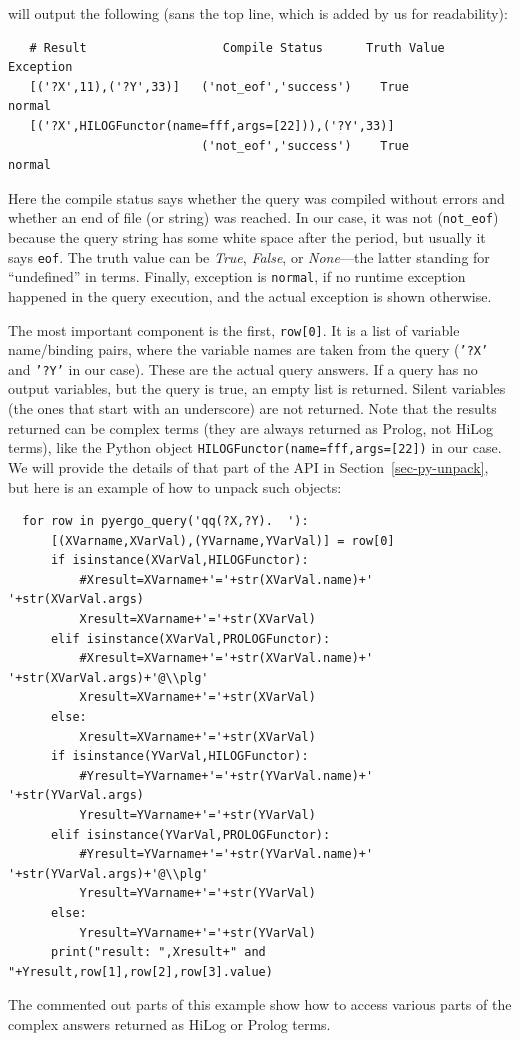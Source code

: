 will output the following (sans the top line, which is added by us for readability):
\begin{verbatim}
   # Result                   Compile Status      Truth Value    Exception
   [('?X',11),('?Y',33)]   ('not_eof','success')    True           normal
   [('?X',HILOGFunctor(name=fff,args=[22])),('?Y',33)]
                           ('not_eof','success')    True           normal
\end{verbatim}
Here the compile status says whether the query was compiled without errors
and whether an end of file (or string)
was reached. In our case, it was not (\texttt{not\_eof}) because the
query string has some white space after the period, but usually it says
\texttt{eof}. The truth value can be \emph{True}, \emph{False}, or
\emph{None}---the latter standing for ``undefined'' in \ERGO terms.    
Finally, exception is \texttt{normal}, if no runtime exception 
happened in the query execution, and the actual exception is shown
otherwise.

The most important component is the first, \texttt{row[0]}.
It is a list of variable name/binding pairs, where the variable names are
taken from the query (\texttt{'?X'} and \texttt{'?Y'} in our case).
These are the actual query answers. If a query has no output variables, but
the query is true, an empty list is returned. Silent variables (the ones
that start with an underscore) are not returned.
Note that the results returned can be complex terms (they are always returned as
Prolog, not HiLog terms), like the Python object
\texttt{HILOGFunctor(name=fff,args=[22])}  in our case.
We will provide the details of that part of the API in 
Section~\ref{sec-py-unpack},
but here is an example of how to unpack such objects:
\begin{verbatim}
  for row in pyergo_query('qq(?X,?Y).  '):
      [(XVarname,XVarVal),(YVarname,YVarVal)] = row[0]
      if isinstance(XVarVal,HILOGFunctor):
          #Xresult=XVarname+'='+str(XVarVal.name)+' '+str(XVarVal.args)
          Xresult=XVarname+'='+str(XVarVal)
      elif isinstance(XVarVal,PROLOGFunctor):
          #Xresult=XVarname+'='+str(XVarVal.name)+' '+str(XVarVal.args)+'@\\plg'
          Xresult=XVarname+'='+str(XVarVal)
      else:
          Xresult=XVarname+'='+str(XVarVal)
      if isinstance(YVarVal,HILOGFunctor):
          #Yresult=YVarname+'='+str(YVarVal.name)+' '+str(YVarVal.args)
          Yresult=YVarname+'='+str(YVarVal)
      elif isinstance(YVarVal,PROLOGFunctor):
          #Yresult=YVarname+'='+str(YVarVal.name)+' '+str(YVarVal.args)+'@\\plg'
          Yresult=YVarname+'='+str(YVarVal)
      else:
          Yresult=YVarname+'='+str(YVarVal)
      print("result: ",Xresult+" and "+Yresult,row[1],row[2],row[3].value)
\end{verbatim}
The commented out parts of this example show how to access various parts of
the complex answers returned as HiLog or Prolog terms.

